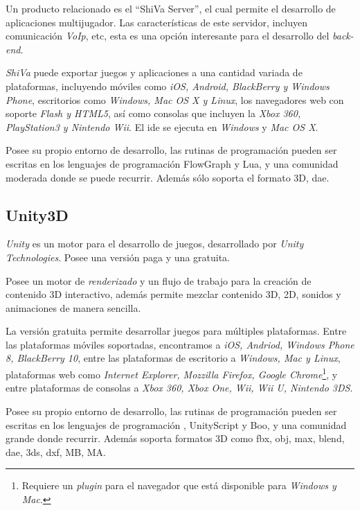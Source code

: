 Un producto relacionado es el \enquote{ShiVa Server}, el cual permite el
desarrollo de aplicaciones multijugador. Las características de este servidor,
incluyen comunicación \textit{VoIp}, etc\cite{shiva}, esta es
una opción interesante para el desarrollo del \textit{back-end}.

\textit{ShiVa} puede exportar juegos y aplicaciones a una cantidad variada de 
plataformas, incluyendo móviles como \textit{iOS, Android, BlackBerry y Windows
Phone}, escritorios como \textit{Windows, Mac OS X y Linux}, los
navegadores web con soporte \textit{Flash y HTML5}, así como consolas que incluyen la
\textit{Xbox 360, PlayStation3 y Nintendo Wii}. El \Gls{ide} se ejecuta en
\textit{Windows} y \textit{Mac OS X}\cite{shiva}. 

Posee su propio entorno de desarrollo, las rutinas de programación pueden ser 
escritas en los lenguajes de programación FlowGraph y Lua, y una 
comunidad moderada donde se puede recurrir. Además sólo soporta el formato 
3D, dae\cite{shiva}.


\subsection{Unity3D}

\textit{Unity} es un motor para el desarrollo de juegos, desarrollado por
\textit{Unity Technologies}. Posee una versión paga y una
gratuita\cite{unity3d}.

Posee un motor de \textit{renderizado} y un flujo de trabajo para la creación de
contenido 3D interactivo, además permite mezclar contenido 3D, 2D, sonidos y
animaciones de manera sencilla\cite{unity3d}.

La versión gratuita permite desarrollar juegos para múltiples plataformas. 
Entre las plataformas móviles soportadas, encontramos a \textit{iOS, Andriod, 
Windows Phone 8, BlackBerry 10}, entre las plataformas de escritorio a 
\textit{Windows, Mac y Linux}, plataformas web como \textit{Internet Explorer,
    Mozzilla Firefox, Google Chrome}\footnote{Requiere un \textit{plugin} para
    el navegador que está disponible para \textit{Windows y Mac}.}, y entre
plataformas de consolas a \textit{Xbox 360, Xbox One, Wii, Wii U, Nintendo
    3DS}\cite{unity3d}.

Posee su propio entorno de desarrollo, las rutinas de programación pueden ser 
escritas en los lenguajes de programación \cs{}, UnityScript y Boo, y una 
comunidad grande donde recurrir. Además soporta formatos 3D como fbx, obj, max, 
blend, dae, 3ds, dxf, MB, MA\cite{unity3d}.

